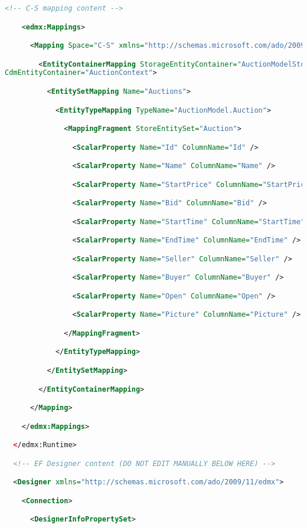\documentclass[a4paper,10pt]{scrreprt}
\begin{document}
\begin{lstlisting}[caption=sample edmx file,language=xml]
    <!-- C-S mapping content -->

    <edmx:Mappings>

      <Mapping Space="C-S" xmlns="http://schemas.microsoft.com/ado/2009/11/mapping/cs">

        <EntityContainerMapping StorageEntityContainer="AuctionModelStoreContainer" 
CdmEntityContainer="AuctionContext">

          <EntitySetMapping Name="Auctions">

            <EntityTypeMapping TypeName="AuctionModel.Auction">

              <MappingFragment StoreEntitySet="Auction">

                <ScalarProperty Name="Id" ColumnName="Id" />

                <ScalarProperty Name="Name" ColumnName="Name" />

                <ScalarProperty Name="StartPrice" ColumnName="StartPrice" />

                <ScalarProperty Name="Bid" ColumnName="Bid" />

                <ScalarProperty Name="StartTime" ColumnName="StartTime" />

                <ScalarProperty Name="EndTime" ColumnName="EndTime" />

                <ScalarProperty Name="Seller" ColumnName="Seller" />

                <ScalarProperty Name="Buyer" ColumnName="Buyer" />

                <ScalarProperty Name="Open" ColumnName="Open" />

                <ScalarProperty Name="Picture" ColumnName="Picture" />

              </MappingFragment>

            </EntityTypeMapping>

          </EntitySetMapping>

        </EntityContainerMapping>

      </Mapping>

    </edmx:Mappings>

  </edmx:Runtime>

  <!-- EF Designer content (DO NOT EDIT MANUALLY BELOW HERE) -->

  <Designer xmlns="http://schemas.microsoft.com/ado/2009/11/edmx">

    <Connection>

      <DesignerInfoPropertySet>


\end{lstlisting}
\end{document}
